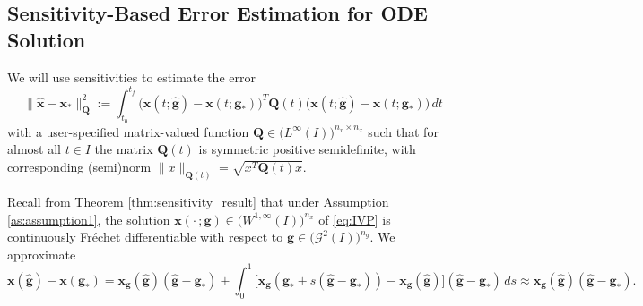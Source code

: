 \documentclass[onefignum,onetabnum]{siamart220329}
\numberwithin{equation}{section}
\newcommand{\bg}{\ensuremath{\mathbf{g}}} %
\newcommand{\bx}{\ensuremath{\mathbf{x}}} %
\newcommand{\BQ}{\ensuremath{\mathbf{Q}} } %
\newcommand {\cG} {\mathcal{G}}
\newcommand{\WW}{\big( W^{1, \infty}(I) \big)^{n_x}}
\begin{document}
\subsection{Sensitivity-Based Error Estimation for ODE Solution}  \label{sec:ODE_sensitivity_sol}
 We will use sensitivities to estimate the error 
 \begin{equation}   \label{eq:x+-err-size}
       \| \widehat{\bx} - \bx_* \|_\BQ^2 := \int_{t_0}^{t_f} \big( \bx(t;\widehat{\bg}) - \bx(t;\bg_*) \big)^T \BQ(t) \big( \bx(t;\widehat{\bg}) - \bx(t;\bg_*) \big) \, dt
\end{equation}
with a user-specified matrix-valued function $\BQ \in \big(L^\infty(I)\big)^{n_x \times n_x}$ such that for almost all $t \in I$ the matrix $\BQ(t)$ is symmetric positive semidefinite, with corresponding (semi)norm $\| x \|_{\BQ(t)} = \sqrt{x^T \BQ(t) x}$.



Recall from Theorem \ref{thm:sensitivity_result} that under Assumption \ref{as:assumption1}, the solution $\bx(\cdot \, ; \bg) \in \WW$ 
of \eqref{eq:IVP} is continuously Fr\'echet differentiable with respect to $\bg \in \big(\cG^2(I)\big)^{n_g}$.
We approximate
\begin{equation}   \label{eq:x-err-sensitivity}
	\bx(\widehat{\bg}) - \bx(\bg_*) 
	=  \bx_\bg(\widehat{\bg})  (\widehat{\bg} - \bg_*)
	        + \int_0^1 \big[\bx_\bg(\bg_*  + s (\widehat{\bg} - \bg_*)) - \bx_\bg(\widehat{\bg})\big] (\widehat{\bg} - \bg_*) \, ds
	\approx \bx_\bg(\widehat{\bg})  (\widehat{\bg} - \bg_*).
\end{equation}
\end{document}
